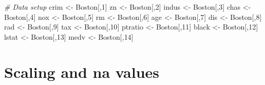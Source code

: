 \documentclass[
]{article}
\newenvironment{Shaded}{\begin{snugshade}}{\end{snugshade}}
\newcommand{\CommentTok}[1]{\textcolor[rgb]{0.56,0.35,0.01}{\textit{#1}}}
\newcommand{\DecValTok}[1]{\textcolor[rgb]{0.00,0.00,0.81}{#1}}
\newcommand{\NormalTok}[1]{#1}
\newcommand{\OtherTok}[1]{\textcolor[rgb]{0.56,0.35,0.01}{#1}}
\begin{document}
\begin{Shaded}
\begin{Highlighting}[]
\CommentTok{\# Data setup}
\NormalTok{crim }\OtherTok{\textless{}{-}}\NormalTok{ Boston[,}\DecValTok{1}\NormalTok{]}
\NormalTok{zn }\OtherTok{\textless{}{-}}\NormalTok{ Boston[,}\DecValTok{2}\NormalTok{]}
\NormalTok{indus }\OtherTok{\textless{}{-}}\NormalTok{ Boston[,}\DecValTok{3}\NormalTok{]}
\NormalTok{chas }\OtherTok{\textless{}{-}}\NormalTok{ Boston[,}\DecValTok{4}\NormalTok{]}
\NormalTok{nox }\OtherTok{\textless{}{-}}\NormalTok{ Boston[,}\DecValTok{5}\NormalTok{]}
\NormalTok{rm }\OtherTok{\textless{}{-}}\NormalTok{ Boston[,}\DecValTok{6}\NormalTok{]}
\NormalTok{age }\OtherTok{\textless{}{-}}\NormalTok{ Boston[,}\DecValTok{7}\NormalTok{]}
\NormalTok{dis }\OtherTok{\textless{}{-}}\NormalTok{ Boston[,}\DecValTok{8}\NormalTok{]}
\NormalTok{rad }\OtherTok{\textless{}{-}}\NormalTok{ Boston[,}\DecValTok{9}\NormalTok{]}
\NormalTok{tax }\OtherTok{\textless{}{-}}\NormalTok{ Boston[,}\DecValTok{10}\NormalTok{]}
\NormalTok{ptratio }\OtherTok{\textless{}{-}}\NormalTok{ Boston[,}\DecValTok{11}\NormalTok{]}
\NormalTok{black }\OtherTok{\textless{}{-}}\NormalTok{ Boston[,}\DecValTok{12}\NormalTok{]}
\NormalTok{lstat }\OtherTok{\textless{}{-}}\NormalTok{ Boston[,}\DecValTok{13}\NormalTok{]}
\NormalTok{medv }\OtherTok{\textless{}{-}}\NormalTok{ Boston[,}\DecValTok{14}\NormalTok{]}
\end{Highlighting}
\end{Shaded}

\section{Scaling and na values}\label{scaling-and-na-values}
\end{document}
